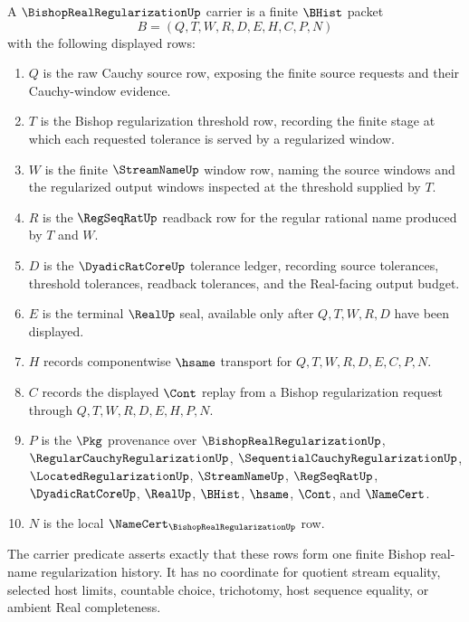 \begin{definition}
\label{def:bishop-real-regularization-carrier}
A $\BishopRealRegularizationUp$ carrier is a finite $\BHist$ packet
$$
B=(Q,T,W,R,D,E,H,C,P,N)
$$
with the following displayed rows:
\begin{enumerate}
\item $Q$ is the raw Cauchy source row, exposing the finite source requests and their Cauchy-window evidence.
\item $T$ is the Bishop regularization threshold row, recording the finite stage at which each requested tolerance is served by a regularized window.
\item $W$ is the finite $\StreamNameUp$ window row, naming the source windows and the regularized output windows inspected at the threshold supplied by $T$.
\item $R$ is the $\RegSeqRatUp$ readback row for the regular rational name produced by $T$ and $W$.
\item $D$ is the $\DyadicRatCoreUp$ tolerance ledger, recording source tolerances, threshold tolerances, readback tolerances, and the Real-facing output budget.
\item $E$ is the terminal $\RealUp$ seal, available only after $Q,T,W,R,D$ have been displayed.
\item $H$ records componentwise $\hsame$ transport for $Q,T,W,R,D,E,C,P,N$.
\item $C$ records the displayed $\Cont$ replay from a Bishop regularization request through $Q,T,W,R,D,E,H,P,N$.
\item $P$ is the $\Pkg$ provenance over $\BishopRealRegularizationUp$, $\RegularCauchyRegularizationUp$, $\SequentialCauchyRegularizationUp$, $\LocatedRegularizationUp$, $\StreamNameUp$, $\RegSeqRatUp$, $\DyadicRatCoreUp$, $\RealUp$, $\BHist$, $\hsame$, $\Cont$, and $\NameCert$.
\item $N$ is the local $\NameCert_{\BishopRealRegularizationUp}$ row.
\end{enumerate}
The carrier predicate asserts exactly that these rows form one finite Bishop real-name regularization history. It has no coordinate for quotient stream equality, selected host limits, countable choice, trichotomy, host sequence equality, or ambient Real completeness.
\end{definition}

